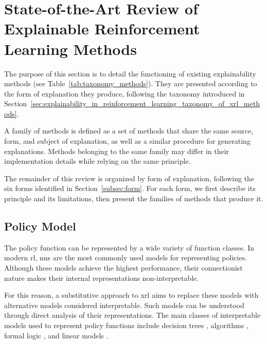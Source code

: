 \let\OriginalSectionMark\sectionmark
\renewcommand{\sectionmark}[1]{\OriginalSectionMark{Review of Explainability Methods}}
\section{State-of-the-Art Review of Explainable Reinforcement Learning Methods}
\label{sec:explainability_in_reinforcement_learning_state_of_the_art_review_of_xrl_methods}
\let\sectionmark\OriginalSectionMark

The purpose of this section is to detail the functioning of existing explainability methods (see Table~\ref{tab:taxonomy_methods}).
They are presented according to the form of explanation they produce, following the taxonomy introduced in Section~\ref{sec:explainability_in_reinforcement_learning_taxonomy_of_xrl_methods}.



A family of methods is defined as a set of methods that share the same source, form, and subject of explanation, as well as a similar procedure for generating explanations.
Methods belonging to the same family may differ in their implementation details while relying on the same principle.

The remainder of this review is organized by form of explanation, following the six forms identified in Section~\ref{subsec:form}.
For each form, we first describe its principle and its limitations, then present the families of methods that produce it.

\subsection{Policy Model}
\label{subsec:policy_model}

The policy function can be represented by a wide variety of function classes.
In modern \gls{rl}, \glspl{nn} are the most commonly used models for representing policies.
Although these models achieve the highest performance, their connectionist nature makes their internal representations non-interpretable.

For this reason, a substitutive approach to \gls{xrl} aims to replace these models with alternative models considered interpretable.
Such models can be understood through direct analysis of their representations.
The main classes of interpretable models used to represent policy functions include decision trees \parencite{topin2021iterative}, algorithms \parencite{trivedi2022learning}, formal logic \parencite{payani2019inductive}, and linear models \parencite{pmlr-v108-garreau20a}.

